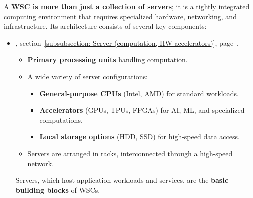 \highspace
A \textbf{WSC is more than just a collection of servers}; it is a tightly integrated computing environment that requires specialized hardware, networking, and infrastructure. Its architecture consists of several key components:
\begin{itemize}
	\item {}, section~\ref{subsubsection: Server (computation, HW accelerators)}, page~\pageref{subsubsection: Server (computation, HW accelerators)}.
    \begin{itemize}
        \item \textbf{Primary processing units} handling computation.
        \item A wide variety of server configurations:
        \begin{itemize}
        	\item \textbf{General-purpose CPUs} (Intel, AMD) for standard workloads.
        	\item \textbf{Accelerators} (GPUs, TPUs, FPGAs) for AI, ML, and specialized computations.
        	\item \textbf{Local storage options} (HDD, SSD) for high-speed data access.
        \end{itemize}
        \item Servers are arranged in racks, interconnected through a high-speed network.
    \end{itemize}
    Servers, which host application workloads and services, are the \textbf{basic building blocks} of WSCs.
	
    \newpage


\end{itemize}
